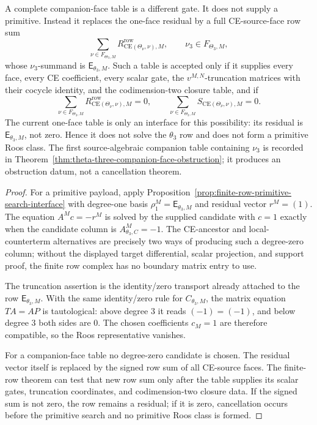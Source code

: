 \begin{prop}
  A complete companion-face table is a different gate.  It does not supply a
  primitive.  Instead it replaces the one-face residual by a full
  CE-source-face row sum
  \[
    \sum_{\nu\in F_{\Theta_3,M}}
      R^{\mathrm{row}}_{\mathrm{CE}(\Theta_\nu,\nu),M},
    \qquad
    \nu_3\in F_{\Theta_3,M},
  \]
  whose \(\nu_3\)-summand is \(\mathsf E_{\theta_3,M}\).  Such a table is
  accepted only if it supplies every face, every CE coefficient, every
  scalar gate, the \(v^{M,N}\)-truncation matrices with their cocycle
  identity, and the codimension-two closure table, and if
  \[
    \sum_{\nu\in F_{\Theta_3,M}}
      R^{\mathrm{row}}_{\mathrm{CE}(\Theta_\nu,\nu),M}=0,
    \qquad
    \sum_{\nu\in F_{\Theta_3,M}}
      S_{\mathrm{CE}(\Theta_\nu,\nu),M}=0.
  \]
  The current one-face table is only an interface for this possibility: its
  residual is \(\mathsf E_{\theta_3,M}\), not zero.  Hence it does not solve
  the \(\theta_3\) row and does not form a primitive Roos class.  The first
  source-algebraic companion table containing \(\nu_3\) is recorded in
  Theorem~\ref{thm:theta-three-companion-face-obstruction}; it produces an
  obstruction datum, not a cancellation theorem.
\end{prop}

\begin{proof}
  For a primitive payload, apply
  Proposition~\ref{prop:finite-row-primitive-search-interface} with
  degree-one basis \(\rho^M_1=\mathsf E_{\theta_3,M}\) and residual vector
  \(r^M=(1)\).  The equation \(A^M c=-r^M\) is solved by the supplied
  candidate with \(c=1\) exactly when the candidate column is
  \(A^M_{\theta_3,C}=-1\).  The CE-ancestor and local-counterterm
  alternatives are precisely two ways of producing such a degree-zero
  column; without the displayed target differential, scalar projection, and
  support proof, the finite row complex has no boundary matrix entry to use.

  The truncation assertion is the identity/zero transport already attached
  to the row \(\mathsf E_{\theta_3,M}\).  With the same identity/zero rule
  for \(C_{\theta_3,M}\), the matrix equation \(T A=A P\) is tautological:
  above degree \(3\) it reads \((-1)=(-1)\), and below degree \(3\) both
  sides are \(0\).  The chosen coefficients \(c_M=1\) are therefore
  compatible, so the Roos representative vanishes.

  For a companion-face table no degree-zero candidate is chosen.  The
  residual vector itself is replaced by the signed row sum of all CE-source
  faces.  The finite-row theorem can test that new row sum only after the
  table supplies its scalar gates, truncation coordinates, and
  codimension-two closure data.  If the signed sum is not zero, the row
  remains a residual; if it is zero, cancellation occurs before the
  primitive search and no primitive Roos class is formed.
\end{proof}

